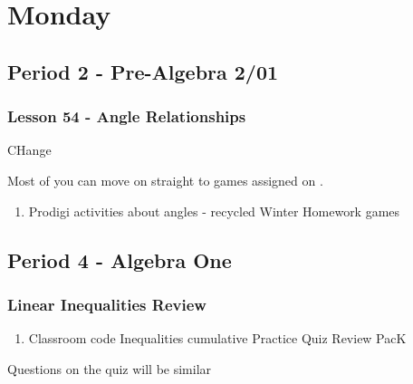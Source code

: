    \section[Mon]{Monday}
   \subsection[PA2/01]{Period 2 - Pre-Algebra 2/01}
   \begin{frame}[label=PA2_01]
   	\frametitle{Lesson 54 - Angle Relationships}

    CHange

   \begin{alertblock}{}
   	Most of you can move on straight to  games assigned on \mangahightext. \\
   \end{alertblock}

      \begin{enumerate}
        \item \mangahightext
        \rightarrowitem Prodigi activities about angles - recycled Winter Homework
        \rightarrowitem {} games
      \end{enumerate}
   	  \end{frame}

     \subsection[ALG]{Period 4 - Algebra One}
   	 \begin{frame}[label=ALG1]
   	 	\frametitle{Linear Inequalities Review}

      \begin{enumerate}
   	    \item {} Classroom code 
        \rightarrowitem Inequalities cumulative Practice
        \rightarrowitem Quiz Review PacK
      \end{enumerate}

      \begin{alertblock}{}
        Questions on the quiz will be similar
     \end{alertblock}
   	  \end{frame}

